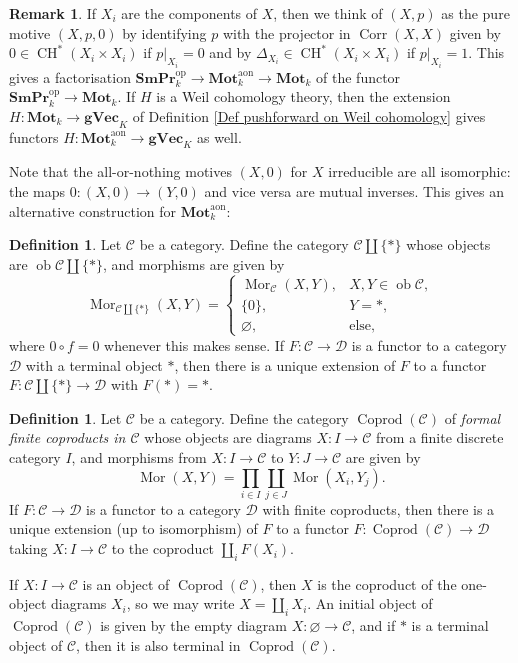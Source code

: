\documentclass[11pt]{amsart}
\theoremstyle{definition}
\newtheorem{Rmk}[Thm]{Remark}
\newtheorem{Def}[Thm]{Definition}
\newcommand{\Mor}{\operatorname{Mor}}
\newcommand{\CH}{\operatorname{CH}}
\newcommand{\op}{^{\operatorname{op}}}
\newcommand{\Corr}{\operatorname{Corr}}
\newcommand{\gVec}{\mathbf{gVec}}
\newcommand{\SmPr}{\mathbf{SmPr}}
\newcommand{\M}{\mathbf{Mot}}
\newcommand{\aon}{^{\text{aon}}}
\begin{document}
\begin{Rmk}\label{Rmk all-or-nothing motives as motives}
If $X_i$ are the components of $X$, then we think of $(X,p)$ as the
pure motive $(X,p,0)$ by identifying $p$ with the projector in
$\Corr(X,X)$ given by $0 \in \CH^*(X_i \times X_i)$ if $p|_{X_i} =
0$ and by $\Delta_{X_i} \in \CH^*(X_i \times X_i)$ if $p|_{X_i} =
1$. This gives a factorisation $\SmPr_k\op \to \M_k\aon \to \M_k$ of
the functor $\SmPr_k\op \to \M_k$. If $H$ is a Weil cohomology
theory, then the extension $H \colon \M_k \to \gVec_K$ of Definition
\ref{Def pushforward on Weil cohomology} gives functors $H \colon
\M_k\aon \to \gVec_K$ as well.

Note that the all-or-nothing motives $(X,0)$ for $X$ irreducible are
all isomorphic: the maps $0 \colon (X,0) \to (Y,0)$ and vice versa
are mutual inverses. This gives an alternative construction for
$\M_k\aon$:
\end{Rmk}

\begin{Def}
Let $\mathscr C$ be a category. Define the category $\mathscr C
\amalg \{*\}$ whose objects are $\operatorname{ob} \mathscr C \amalg
\{*\}$, and morphisms are given by
\[
\Mor_{\mathscr C \amalg\{*\}}(X,Y) =
\left\{\begin{array}{ll}\Mor_{\mathscr C}(X,Y), & X,Y \in
\operatorname{ob} \mathscr C, \\ \{0\}, & Y = *, \\ \varnothing, &
\text{else,}\end{array}\right.
\]
where $0 \circ f = 0$ whenever this makes sense.
If $F \colon \mathscr C \to \mathscr D$ is a functor to a category
$\mathscr D$ with a terminal object $*$, then there is a unique
extension of $F$ to a functor $F \colon \mathscr C \amalg \{*\} \to
\mathscr D$ with $F(*) = *$.
\end{Def}

\begin{Def}
Let $\mathscr C$ be a category. Define the category
$\operatorname{Coprod}(\mathscr C)$ of \emph{formal finite
coproducts in $\mathscr C$} whose objects are diagrams $X \colon I
\to \mathscr C$ from a finite discrete category $I$, and morphisms
from $X \colon I \to \mathscr C$ to $Y \colon J \to \mathscr C$ are
given by
\[
\Mor(X,Y) = \prod_{i \in I} \coprod_{j \in J} \Mor(X_i,Y_j).
\]
If $F \colon \mathscr C \to \mathscr D$ is a functor to a category
$\mathscr D$ with finite coproducts, then there is a unique
extension (up to isomorphism) of $F$ to a functor $F \colon
\operatorname{Coprod}(\mathscr C) \to \mathscr D$ taking $X \colon I
\to \mathscr C$ to the coproduct $\coprod_i F(X_i)$.

If $X \colon I \to \mathscr C$ is an object of
$\operatorname{Coprod}(\mathscr C)$, then $X$ is the coproduct of
the one-object diagrams $X_i$, so we may write $X = \coprod_i X_i$.
An initial object of $\operatorname{Coprod}(\mathscr C)$ is given by
the empty diagram $X \colon \varnothing \to \mathscr C$, and if $*$
is a terminal object of $\mathscr C$, then it is also terminal in
$\operatorname{Coprod}(\mathscr C)$.
\end{Def}
\end{document}
